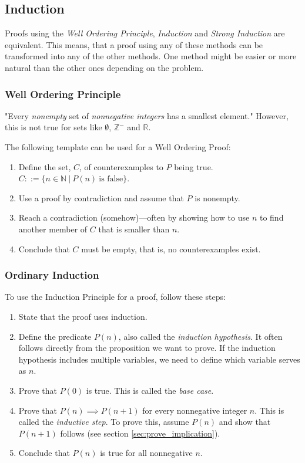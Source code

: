 \documentclass[../main.tex]{subfiles}
\begin{document}
\subsection{Induction}

Proofs using the \textit{Well Ordering Principle}, \textit{Induction} and \textit{Strong Induction} are equivalent. This means, that a proof using any of these methods can be transformed into any of the other methods. One method might be easier or more natural than the other ones depending on the problem.

\subsubsection{Well Ordering Principle}

"Every \textit{nonempty} set of \textit{nonnegative integers} has a smallest element." However, this is not true for sets like $\emptyset$, $\mathbb{Z}^-$ and $\mathbb{R}$.

The following template can be used for a Well Ordering Proof:

\begin{enumerate}
  \item Define the set, $C$, of counterexamples to $P$ being true. $C ::= \{n \in \mathbb{N}\ |\ P(n)\ \text{is false}\}$.
  \item Use a proof by contradiction and assume that $P$ is nonempty.
  \item Reach a contradiction (somehow)---often by showing how to use $n$ to find another member of $C$ that is smaller than $n$.
  \item Conclude that $C$ must be empty, that is, no counterexamples exist.
\end{enumerate}

\subsubsection{Ordinary Induction}
\label{sec:ordinary_induction}

To use the Induction Principle for a proof, follow these steps:

\begin{enumerate}
  \item State that the proof uses induction.
  \item Define the predicate $P(n)$, also called the \textit{induction hypothesis}. It often follows directly from the proposition we want to prove. If the induction hypothesis includes multiple variables, we need to define which variable serves as $n$.
  \item Prove that $P(0)$ is true. This is called the \textit{base case}.
  \item Prove that $P(n) \implies P(n+1)$ for every nonnegative integer $n$. This is called the \textit{inductive step}. To prove this, assume $P(n)$ and show that $P(n+1)$ follows (see section \ref{sec:prove_implication}).
  \item Conclude that $P(n)$ is true for all nonnegative $n$.
\end{enumerate}
\end{document}
